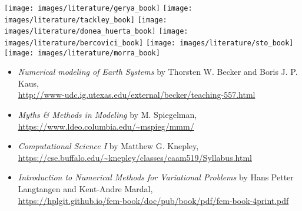 
\begin{center}
\texttt{[image: images/literature/gerya\_book]}
\texttt{[image: images/literature/tackley\_book]}
\texttt{[image: images/literature/donea\_huerta\_book]}
\texttt{[image: images/literature/bercovici\_book]}
\texttt{[image: images/literature/sto\_book]}
\texttt{[image: images/literature/morra\_book]}\\
\cite{gery10} \hspace{1.52cm} 
\cite{tack10} \hspace{1.52cm} 
\cite{dohu03} \hspace{1.52cm} 
\cite{berc09} \hspace{1.52cm} 
\cite{scto01} \hspace{1.52cm} 
\cite{morr18}
\end{center}

\begin{itemize}
\item {\it Numerical modeling of Earth Systems} by Thorsten W. Becker and Boris J. P. Kaus,\\ 
\url{http://www-udc.ig.utexas.edu/external/becker/teaching-557.html}

\item {\it Myths \& Methods in Modeling} by M. Spiegelman,\\
 \url{https://www.ldeo.columbia.edu/~mspieg/mmm/}

\item {\it Computational Science I} by Matthew G. Knepley,\\
 \url{https://cse.buffalo.edu/~knepley/classes/caam519/Syllabus.html}

\item {\it Introduction to Numerical Methods for Variational Problems} by Hans Petter Langtangen and 
Kent-Andre Mardal, \\
\url{https://hplgit.github.io/fem-book/doc/pub/book/pdf/fem-book-4print.pdf}
\end{itemize}

